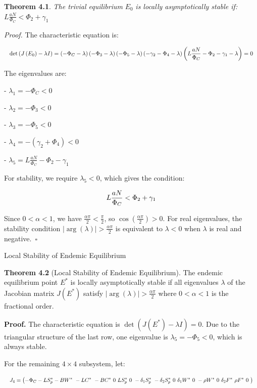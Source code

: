 \documentclass[10pt]{NSP1}
\newcommand{\fitwidth}[1]{\resizebox{\ifdim\width>\linewidth\linewidth\else\width\fi}{!}{#1}}
\begin{document}
\textbf{Theorem 4.1}. \emph{The trivial equilibrium} \(E_{0}\) \emph{is locally asymptotically stable if:} \(L\frac{aN}{\Phi_{C}} < \Phi_{2} + \gamma_{1}\)

\emph{Proof.} The characteristic equation is:

\[
\fitwidth{$\displaystyle \det\left( J\left( E_{0} \right) - \lambda I \right) = \left( - \Phi_{C} - \lambda \right)\left( - \Phi_{3} - \lambda \right)\left( - \Phi_{5} - \lambda \right)\left( - \gamma_{2} - \Phi_{4} - \lambda \right)\left( L\frac{aN}{\Phi_{C}} - \Phi_{2} - \gamma_{1} - \lambda \right) = 0$}
\]

The eigenvalues are:

- \(\lambda_{1} = - \Phi_{C} < 0\)

- \(\lambda_{2} = - \Phi_{3} < 0\)

- \(\lambda_{3} = - \Phi_{5} < 0\)

- \(\lambda_{4} = - \left( \gamma_{2} + \Phi_{4} \right) < 0\)

- \(\lambda_{5} = L\frac{aN}{\Phi_{C}} - \Phi_{2} - \gamma_{1}\)

For stability, we require \(\lambda_{5} < 0\), which gives the condition:

\[
\fitwidth{$\displaystyle L\frac{aN}{\Phi_{C}} < \Phi_{2} + \gamma_{1}$}
\]

Since \(0 < \alpha < 1\), we have \(\frac{\alpha\pi}{2} < \frac{\pi}{2}\), so \(\cos\left( \frac{\alpha\pi}{2} \right) > 0\). For real eigenvalues, the stability condition \(\left| \arg(\lambda) \right| > \frac{\alpha\pi}{2}\) is equivalent to \(\lambda < 0\) when \(\lambda\) is real and negative.~$\square$

Local Stability of Endemic Equilibrium

\textbf{Theorem 4.2} (Local Stability of Endemic Equilibrium). The endemic equilibrium point \(E^{*}\) is locally asymptotically stable if all eigenvalues \(\lambda\) of the Jacobian matrix \(J\left( E^{*} \right)\) satisfy \(\left| \arg(\lambda) \right| > \frac{\alpha\pi}{2}\) where \(0 < \alpha < 1\) is the fractional order.

\textbf{Proof.} The characteristic equation is \(\det\left( J\left( E^{*} \right) - \lambda I \right) = 0\). Due to the triangular structure of the last row, one eigenvalue is \(\lambda_{5} = - \Phi_{5} < 0\), which is always stable.

For the remaining \(4 \times 4\) subsystem, let:

\[
\fitwidth{$\displaystyle J_{4} = \left( - \Phi_{C} - LS_{p}^{*} - BW^{*}\  - LC^{*}\  - BC^{*}\ 0\ LS_{p}^{*}\ 0\  - \delta_{1}S_{p}^{*}\  - \delta_{2}S_{p}^{*}\ 0\ \delta_{1}W^{*}\ 0\  - \rho W^{*}\ 0\ \delta_{2}F^{*}\ \rho F^{*}\ 0\  \right)$}
\]
\end{document}
